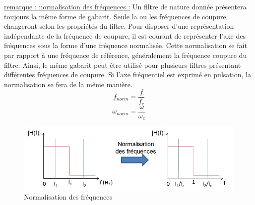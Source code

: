 \documentclass[]{report}
\begin{document}
	
	\underline{remarque : normalisation des fréquences :}
	Un filtre de nature donnée présentera toujours la même forme de gabarit. Seule la ou les fréquences de coupure changeront selon les propriétés du filtre. Pour disposer d'une représentation indépendante de la fréquence de coupure, il est courant de représenter l'axe des fréquences sous la forme d'une fréquence normalisée. Cette normalisation se fait par rapport à une fréquence de référence, généralement la fréquence coupure du filtre. Ainsi, le même gabarit peut être utilisé pour plusieurs filtres présentant différentes fréquences de coupure. Si l'axe fréquentiel est exprimé en pulsation, la normalisation se fera de la même manière.
	\begin{equation}\label{key}
	f_{norm} = \frac{f}{f_{c}}
	\end{equation}
	\begin{equation}\label{key}
	\omega_{norm} = \frac{\omega}{\omega_{c}}
	\end{equation}
	
	\begin{figure}[h!]
		\centering
		\includegraphics[scale=0.6]{images/freq_norm.jpg}
		\caption{Normalisation des fréquences}	
		\label{Fig:freq_norm} 
	\end{figure}
\end{document}
